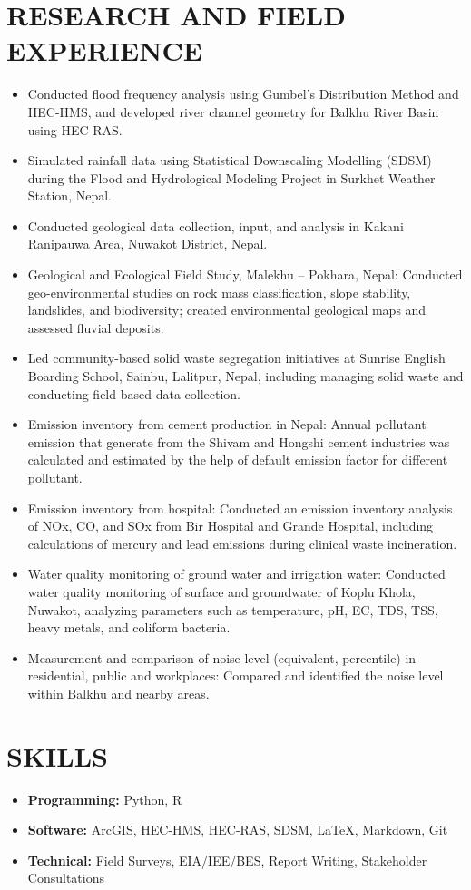 \documentclass[a4paper, 11pt]{extarticle}
\begin{document}
\section*{RESEARCH AND FIELD EXPERIENCE}
\begin{itemize}
    \item Conducted flood frequency analysis using Gumbel’s Distribution Method and HEC-HMS, and developed river channel geometry for Balkhu River Basin using HEC-RAS.
    \item Simulated rainfall data using Statistical Downscaling Modelling (SDSM) during the Flood and Hydrological Modeling Project in Surkhet Weather Station, Nepal.
    \item Conducted geological data collection, input, and analysis in Kakani Ranipauwa Area, Nuwakot District, Nepal.
    \item Geological and Ecological Field Study, Malekhu – Pokhara, Nepal: Conducted geo-environmental studies on rock mass classification, slope stability, landslides, and biodiversity; created environmental geological maps and assessed fluvial deposits.
    \item Led community-based solid waste segregation initiatives at Sunrise English Boarding School, Sainbu, Lalitpur, Nepal, including managing solid waste and conducting field-based data collection.
    \item Emission inventory from cement production in Nepal:  Annual pollutant emission that generate from the Shivam and Hongshi cement industries was calculated and estimated by the help of default emission factor for different pollutant.
    \item Emission inventory from hospital: Conducted an emission inventory analysis of NOx, CO, and SOx from Bir Hospital and Grande Hospital, including calculations of mercury and lead emissions during clinical waste incineration.
    \item Water quality monitoring of ground water and irrigation water: Conducted water quality monitoring of surface and groundwater of Koplu Khola, Nuwakot, analyzing parameters such as temperature, pH, EC, TDS, TSS, heavy metals, and coliform bacteria.
    \item Measurement and comparison of noise level (equivalent, percentile) in residential, public and workplaces: Compared and identified the noise level within Balkhu and nearby areas.
\end{itemize}

\vspace{5pt}
\section*{SKILLS}
\begin{itemize}
    \item \textbf{Programming:} Python, R
    \item \textbf{Software:} ArcGIS, HEC-HMS, HEC-RAS, SDSM, LaTeX, Markdown, Git
    \item \textbf{Technical:} Field Surveys, EIA/IEE/BES, Report Writing, Stakeholder Consultations
\end{itemize}
\end{document}
